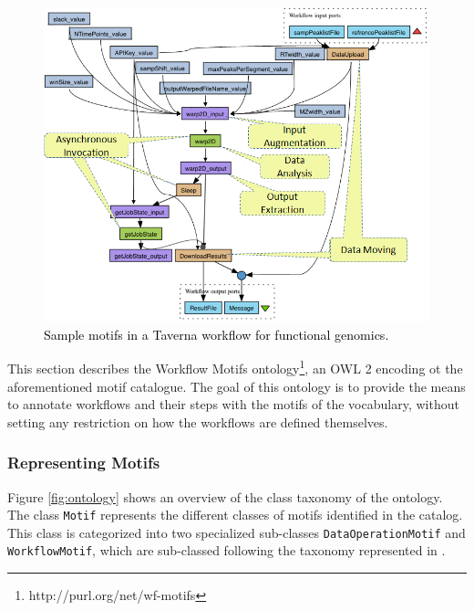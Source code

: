 \begin{figure}[ht!]
\centering
\includegraphics[scale=0.70]{Figures/taverna-wf-motifs.png}
\caption{\textcolor{black}{Sample motifs in a Taverna workflow for functional genomics.}}
\label{fig:tav_wf_motifs}
\end{figure}

This section describes the Workflow Motifs ontology\footnote{http://purl.org/net/wf-motifs}, an OWL 2 encoding ot the aforementioned motif catalogue. The goal of this ontology is to provide the means to annotate workflows and their steps with the motifs of the vocabulary, without setting any restriction on how the workflows are defined themselves.

\subsubsection{Representing Motifs}
Figure \ref{fig:ontology} shows an overview of the class taxonomy of the ontology. The class {\tt  Motif} represents the different classes of motifs identified in the catalog. This class is categorized into two specialized sub-classes {\tt  DataOperationMotif} and {\tt  WorkflowMotif}, which are sub-classed following the taxonomy represented in \cite{garijo_Alper_2012}.

